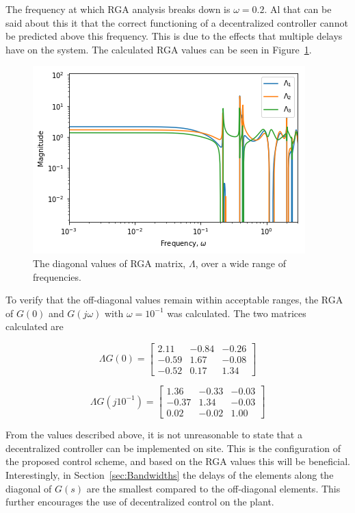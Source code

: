The frequency at which RGA analysis breaks down is $\omega = 0.2$. Al that can be said about this it that the correct functioning of a decentralized controller cannot be predicted above this frequency. This is due to the effects that multiple delays have on the system. The calculated RGA values can be seen in Figure~\ref{fig:rga-values}.

\begin{figure}[H]
	\centering
	\includegraphics[width=0.7\linewidth]{"Figures/RGA Values"}
	\caption{The diagonal values of RGA matrix, $\Lambda$, over a wide range of frequencies.}
	\label{fig:rga-values}
\end{figure}

To verify that the off-diagonal values remain within acceptable ranges, the RGA of $G(0)$ and $G(j\omega)$ with $\omega = 10^{-1}$ was calculated. The two matrices calculated are

\begin{equation}
	\Lambda G(0) = \begin{bmatrix}
	2.11 & -0.84 & -0.26\\
	-0.59 & 1.67 & -0.08\\
	-0.52 & 0.17 & 1.34
	\end{bmatrix}
\end{equation}

\begin{equation}
\Lambda G(j10^{-1}) = \begin{bmatrix}
1.36 & -0.33 & -0.03\\
-0.37 & 1.34 & -0.03\\
0.02 & -0.02 & 1.00
\end{bmatrix}
\end{equation}

From the values described above, it is not unreasonable to state that a decentralized controller can be implemented on site. This is the configuration of the proposed control scheme, and based on the RGA values this will be beneficial. Interestingly, in Section~\ref{sec:Bandwidths} the delays of the elements along the diagonal of $G(s)$ are the smallest compared to the off-diagonal elements. This further encourages the use of decentralized control on the plant.


